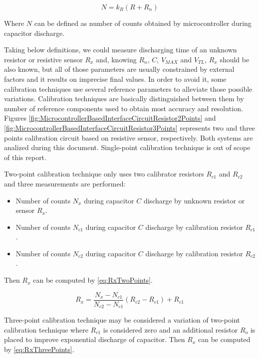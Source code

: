 \begin{equation}
\label{eq:DischargeTimeRedefined}
N = k_{R}(R+R_{n})
\end{equation}

Where $N$ can be defined as number of counts obtained by microcontroller during capacitor discharge.
\medskip

Taking below definitions, we could measure discharging time of an unknown resistor or resistive sensor $R_{x}$ and, knowing $R_{n}$, $C$, $V_{MAX}$ and $V_{TL}$, $R_{x}$ should be also known, but all of those parameters are usually constrained by external factors and it results on imprecise final values. In order to avoid it, some calibration techniques use several reference parameters to alleviate those possible variations. Calibration techniques are basically distinguished between them by number of reference components used to obtain most accuracy and resolution. Figures \ref{fig:MicrocontrollerBasedInterfaceCircuitResistor2Points} and \ref{fig:MicrocontrollerBasedInterfaceCircuitResistor3Points} represents two and three points calibration circuit based on resistive sensor, respectively. Both systems are analized during this document. Single-point calibration technique is out of scope of this report.
\medskip

Two-point calibration technique only uses two calibrator resistors $R_{c1}$ and $R_{c2}$ and three measurements are performed:
\medskip

\begin{itemize}
\item Number of counts $N_{x}$ during capacitor $C$ discharge by unknown resistor or sensor $R_{x}$.
\item Number of counts $N_{c1}$ during capacitor $C$ discharge by calibration resistor $R_{c1}$.
\item Number of counts $N_{c2}$ during capacitor $C$ discharge by calibration resistor $R_{c2}$.
\end{itemize}
\medskip

Then $R_{x}$ can be computed by \eqref{eq:RxTwoPoints}.

\begin{equation}
\label{eq:RxTwoPoints}
R_{x} = \frac{N_{x}-N_{c1}}{N_{c2}-N_{c1}}(R_{c2}-R_{c1})+R_{c1}
\end{equation}

Three-point calibration technique may be considered a variation of two-point calibration technique where $R_{c1}$ is considered zero and an additional resistor $R_{o}$ is placed to improve exponential discharge of capacitor. Then $R_{x}$ can be computed by \eqref{eq:RxThreePoints}.

